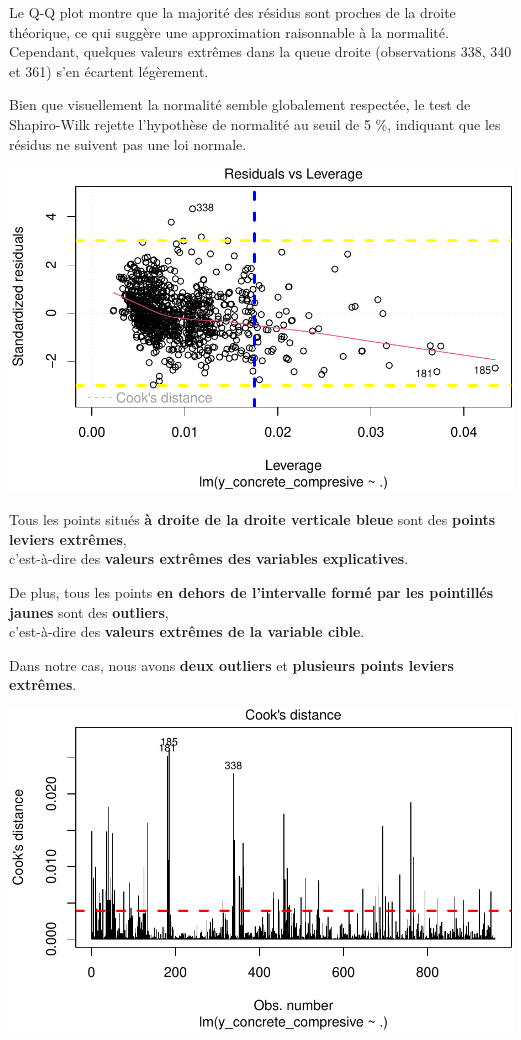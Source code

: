 \documentclass[
  12pt,
]{article}
\begin{document}
Le Q-Q plot montre que la majorité des résidus sont proches de la droite
théorique, ce qui suggère une approximation raisonnable à la normalité.
Cependant, quelques valeurs extrêmes dans la queue droite (observations
338, 340 et 361) s'en écartent légèrement.

Bien que visuellement la normalité semble globalement respectée, le test
de Shapiro-Wilk rejette l'hypothèse de normalité au seuil de 5 \%,
indiquant que les résidus ne suivent pas une loi normale.

\includegraphics{rmd_final_files/figure-latex/unnamed-chunk-45-1.pdf}

Tous les points situés \textbf{à droite de la droite verticale bleue}
sont des \textbf{points leviers extrêmes},\\
c'est-à-dire des \textbf{valeurs extrêmes des variables explicatives}.

De plus, tous les points \textbf{en dehors de l'intervalle formé par les
pointillés jaunes} sont des \textbf{outliers},\\
c'est-à-dire des \textbf{valeurs extrêmes de la variable cible}.

Dans notre cas, nous avons \textbf{deux outliers} et \textbf{plusieurs
points leviers extrêmes}.

\includegraphics{rmd_final_files/figure-latex/unnamed-chunk-46-1.pdf}
\end{document}
